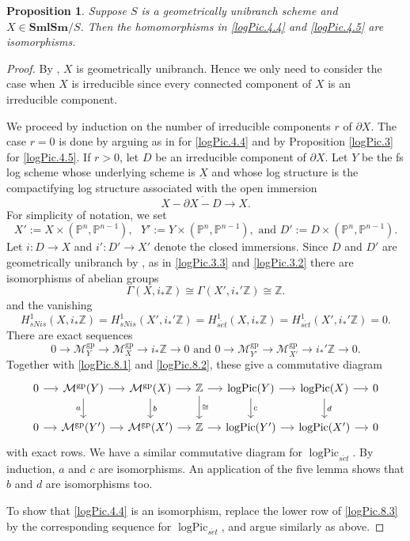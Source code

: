 \documentclass[11pt, a4paper]{amsart}
\newtheorem{prop}[thm]{Proposition}
\theoremstyle{definition}
\numberwithin{equation}{subsection}
\newcommand{\Z}{\mathbb{Z}}
\renewcommand{\P}{\mathbb{P}}
\newcommand{\SmlSm}{\mathbf{SmlSm}}
\renewcommand{\ul}{\underline}
\newcommand{\gp}{{\mathrm{gp}}}
\newcommand{\set}{{s\acute{e}t}}
\newcommand{\logPic}{\operatorname{logPic}}
\newcommand{\cM}{\mathcal{M}}
\begin{document}
\begin{prop}
\label{logPic.8}
Suppose $S$ is a geometrically unibranch scheme and $X\in \SmlSm/S$.
Then the homomorphisms in \eqref{logPic.4.4} and \eqref{logPic.4.5} are isomorphisms.
\end{prop}
\begin{proof}
By \cite[Proposition 17.5.7]{EGA}, $X$ is geometrically unibranch.
Hence we only need to consider the case when $X$ is irreducible since every connected component of $X$ is an irreducible component.

We proceed by induction on the number of irreducible components $r$ of $\partial X$.
The case $r=0$ is done by arguing as in  \cite[\href{https://stacks.math.columbia.edu/tag/03P7}{Tag 03P7}]{stacks-project} for \eqref{logPic.4.4} and by Proposition \ref{logPic.3} for \eqref{logPic.4.5}.
If $r>0$, let $D$ be an irreducible component of $\partial X$.
Let $Y$ be the fs log scheme whose underlying scheme is $\ul{X}$ and whose log structure is the compactifying log structure associated with the open immersion
\[
X-\overline{\partial X-D}\to X.
\]
For simplicity of notation, we set
\[
X':=X\times (\P^n,\P^{n-1}),
\text{ }
Y':=Y\times (\P^n,\P^{n-1}),
\text{ and }
D':=D\times (\P^n,\P^{n-1}).
\]
Let $i\colon D\to X$ and $i'\colon D'\to X'$ denote the closed immersions.
Since $D$ and $D'$ are geometrically unibranch by \cite[Proposition 17.5.7]{EGA}, 
as in \eqref{logPic.3.3} and \eqref{logPic.3.2} there are isomorphisms of abelian groups
\begin{equation}
\label{logPic.8.1}
\Gamma(X,i_*\Z) \cong \Gamma(X',i_*'\Z)\cong \Z.
\end{equation}
and the vanishing
\begin{equation}
\label{logPic.8.2}
H_{sNis}^1(X,i_*\Z)
=
H_{sNis}^1(X',i_*'\Z)
=
H_{\set}^1(X,i_*\Z)
=
H_{\set}^1(X',i_*'\Z)
=
0.
\end{equation}
There are exact sequences
\[
0\to \cM_Y^{\gp} \to \cM_X^{\gp} \to i_*\Z\to 0
\text{ and }
0\to \cM_{Y'}^{\gp} \to \cM_{X'}^{\gp} \to i_*'\Z\to 0.
\]
Together with \eqref{logPic.8.1} and \eqref{logPic.8.2}, these give a commutative diagram 
\begin{equation}
\label{logPic.8.3}
\begin{tikzcd}[column sep=small]
0\ar[r]&
\cM^{\gp}(Y)\ar[r]\ar[d,"a"']&
\cM^{\gp}(X)\ar[r]\ar[d,"b"]&
\Z\ar[r]\ar[d,"\cong"]&
\logPic(Y)\ar[r]\ar[d,"c"]&
\logPic(X)\ar[r]\ar[d,"d"]&
0
\\
0\ar[r]&
\cM^{\gp}(Y')\ar[r]&
\cM^{\gp}(X')\ar[r]&
\Z\ar[r]&
\logPic(Y')\ar[r]&
\logPic(X')\ar[r]&
0
\end{tikzcd}
\end{equation}
with exact rows.
We have a similar commutative diagram for $\logPic_{\set}$.
By induction, $a$ and $c$ are isomorphisms.
An application of the five lemma shows that $b$ and $d$ are isomorphisms too.

To show that \eqref{logPic.4.4} is an isomorphism, replace the lower row of \eqref{logPic.8.3} by the corresponding sequence for $\logPic_{\set}$, and argue similarly as above.
\end{proof}
\end{document}
